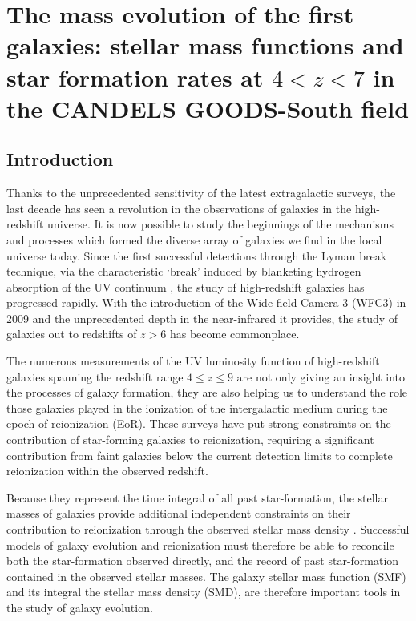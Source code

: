 \chapter[The mass evolution of the first galaxies]{The mass evolution of the first galaxies: stellar mass functions and star formation rates at $4 < z < 7$ in the CANDELS GOODS-South field}\label{ch:smf}

\section{Introduction}
Thanks to the unprecedented sensitivity of the latest extragalactic surveys, the last decade has seen a revolution in the observations of galaxies in the high-redshift universe. It is now possible to study the beginnings of the mechanisms and processes which formed the diverse array of galaxies we find in the local universe today. Since the first successful detections through the Lyman break technique, via the characteristic `break' induced by blanketing hydrogen absorption of the UV continuum \citep{1990ApJ...357L...9G, 1992AJ....104..941S}, the study of high-redshift galaxies has progressed rapidly. With the introduction of the Wide-field Camera 3 (WFC3) in 2009 and the unprecedented depth in the near-infrared it provides, the study of galaxies out to redshifts of $z > 6$ has become commonplace. 

The numerous measurements of the UV luminosity function of high-redshift galaxies spanning the redshift range $4 \leq z \leq 9$ \citep{2007ApJ...670..928B,2009MNRAS.395.2196M,Oesch:2009ew,Bouwens:2010dk,2011A&A...532A..33G,Lorenzoni:2011iz,McLure:2013hh,Schenker:2013cl} are not only giving an insight into the processes of galaxy formation, they are also helping us to understand the role those galaxies played in the ionization of the intergalactic medium during the epoch of reionization (EoR). These surveys have put strong constraints on the contribution of star-forming galaxies to reionization, requiring a significant contribution from faint galaxies below the current detection limits to complete reionization within the observed redshift.

Because they represent the time integral of all past star-formation, the stellar masses of galaxies provide additional independent constraints on their contribution to reionization through the observed stellar mass density \citep{2010Natur.468...49R}. Successful models of galaxy evolution and reionization must therefore be able to reconcile both the star-formation observed directly, and the record of past star-formation contained in the observed stellar masses. The galaxy stellar mass function (SMF) and its integral the stellar mass density (SMD), are therefore  important tools in the study of galaxy evolution.

